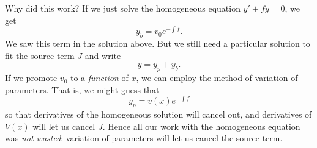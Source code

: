 Why did this work? If we just solve the homogeneous equation $y' + fy=0$, we get 
\begin{equation}
    y_b=v_0 e^{-\int f}.
\end{equation}
We saw this term in the solution above. But we still need a particular solution to fit the source term $J$ and write
\begin{equation}
    y= y_p +y_b.
\end{equation}
If we promote $v_0$ to a \emph{function} of $x$, we can employ the method of variation of parameters. That is, we might guess that
\begin{equation}
    y_p = v(x) e^{-\int f}
\end{equation}
so that derivatives of the homogeneous solution will cancel out, and derivatives of $V(x)$ will let us cancel $J$. Hence all our work with the homogeneous equation was \emph{not wasted}; variation of parameters will let us cancel the source term.

